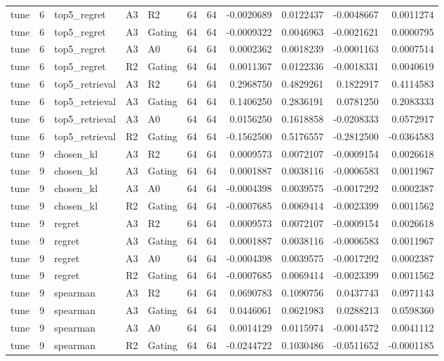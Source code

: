 \begin{tabular}{lrlllrrrrrr}
tune & 6 & top5_regret & A3 & R2 & 64 & 64 & -0.0020689 & 0.0122437 & -0.0048667 & 0.0011274 \\
tune & 6 & top5_regret & A3 & Gating & 64 & 64 & -0.0009322 & 0.0046963 & -0.0021621 & 0.0000795 \\
tune & 6 & top5_regret & A3 & A0 & 64 & 64 & 0.0002362 & 0.0018239 & -0.0001163 & 0.0007514 \\
tune & 6 & top5_regret & R2 & Gating & 64 & 64 & 0.0011367 & 0.0122336 & -0.0018331 & 0.0040619 \\
tune & 6 & top5_retrieval & A3 & R2 & 64 & 64 & 0.2968750 & 0.4829261 & 0.1822917 & 0.4114583 \\
tune & 6 & top5_retrieval & A3 & Gating & 64 & 64 & 0.1406250 & 0.2836191 & 0.0781250 & 0.2083333 \\
tune & 6 & top5_retrieval & A3 & A0 & 64 & 64 & 0.0156250 & 0.1618858 & -0.0208333 & 0.0572917 \\
tune & 6 & top5_retrieval & R2 & Gating & 64 & 64 & -0.1562500 & 0.5176557 & -0.2812500 & -0.0364583 \\
tune & 9 & chosen_kl & A3 & R2 & 64 & 64 & 0.0009573 & 0.0072107 & -0.0009154 & 0.0026618 \\
tune & 9 & chosen_kl & A3 & Gating & 64 & 64 & 0.0001887 & 0.0038116 & -0.0006583 & 0.0011967 \\
tune & 9 & chosen_kl & A3 & A0 & 64 & 64 & -0.0004398 & 0.0039575 & -0.0017292 & 0.0002387 \\
tune & 9 & chosen_kl & R2 & Gating & 64 & 64 & -0.0007685 & 0.0069414 & -0.0023399 & 0.0011562 \\
tune & 9 & regret & A3 & R2 & 64 & 64 & 0.0009573 & 0.0072107 & -0.0009154 & 0.0026618 \\
tune & 9 & regret & A3 & Gating & 64 & 64 & 0.0001887 & 0.0038116 & -0.0006583 & 0.0011967 \\
tune & 9 & regret & A3 & A0 & 64 & 64 & -0.0004398 & 0.0039575 & -0.0017292 & 0.0002387 \\
tune & 9 & regret & R2 & Gating & 64 & 64 & -0.0007685 & 0.0069414 & -0.0023399 & 0.0011562 \\
tune & 9 & spearman & A3 & R2 & 64 & 64 & 0.0690783 & 0.1090756 & 0.0437743 & 0.0971143 \\
tune & 9 & spearman & A3 & Gating & 64 & 64 & 0.0446061 & 0.0621983 & 0.0288213 & 0.0598360 \\
tune & 9 & spearman & A3 & A0 & 64 & 64 & 0.0014129 & 0.0115974 & -0.0014572 & 0.0041112 \\
tune & 9 & spearman & R2 & Gating & 64 & 64 & -0.0244722 & 0.1030486 & -0.0511652 & -0.0001185 \\

\end{tabular}
